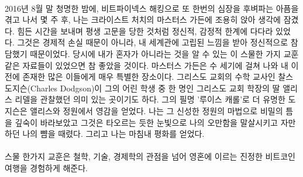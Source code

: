 \paragraph{}
2016년 8월 말 청명한 밤에, 비트파이넥스 해킹으로 또 한번의 심장을 후벼파는 아픔을 겪고 나서 몇 주 후, 나는 크라이스트 처치의 마스터스 가든에 조용히 앉아 생각에 잠겼다. 
힘든 시간을 보내며 평생 고문을 당한 것처럼 정신적, 감정적 한계에 다다라 있었다. 그것은 경제적 손실 때문이 아니라, 내 세계관에 고립된 느낌을 받아 정신적으로 참담했기 때문이었다. 
당시에 내가 혼자가 아니라는 것을 알 수 있는 이 스물한 가지 교훈 같은 자료들이 있었으면 참 좋았을 것이다. 
마스터스 가든은 수 세기에 걸쳐 나와 내 이전에 존재한 많은 이들에게 매우 특별한 장소이다.
그리스도 교회의 수학 교사인 찰스 도지슨(Charles Dodgson)이 그의 어린 학생 중 한 명인 그리스도 교회 학장의 딸 앨리스 리델을 관찰했던 의미 있는 곳이기도 하다.
그의 필명 '루이스 캐롤'로 더 유명한 도지슨은 앨리스와 정원에서 영감을 얻었다. 나는 그 신성한 정원의 마법으로 비밀의 틈을 깊숙이 바라보았고 
그것은 타오르는 듯한 눈빛으로 나의 오만함을 말살시키고 자만하던 나의 뺨을 때렸다. 그리고 나는 마침내 평화를 얻었다. 

\paragraph{}
스물 한가지 교훈은 철학, 기술, 경제학의 관점을 넘어 영혼에 이르는 진정한 비트코인 여행을 경험하게 해준다.

